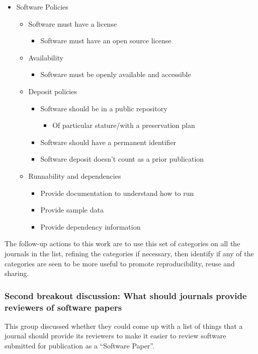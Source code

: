 \documentclass[11pt, oneside]{amsart}
\begin{document}
\begin{itemize}
\item Software Policies
\begin{itemize}
	\item Software must have a license
	\begin{itemize}
		\item Software must have an open source license
	\end{itemize}
	\item Availability
	\begin{itemize}
		\item Software must be openly available and accessible
	\end{itemize}
	\item Deposit policies
	\begin{itemize}
		\item Software should be in a public repository
		\begin{itemize}
			\item Of particular stature/with a preservation plan
		\end{itemize}
		\item Software should have a permanent identifier
		\item Software deposit doesn't count as a prior publication
	\end{itemize}
	\item Runnability and dependencies
	\begin{itemize}
		\item Provide documentation to understand how to run
		\item Provide sample data
		\item Provide dependency information
	\end{itemize}
\end{itemize}
\end{itemize}

The follow-up actions to this work are to use this set of categories on all the
journals in the list, refining the categories if necessary, then identify if any
of the categories are seen to be more useful to promote reproducibility, reuse
and sharing.

\subsubsection{Second breakout discussion: What should journals provide reviewers of software papers}

This group discussed whether they could come up with a list of things that a
journal should provide its reviewers to make it easier to review software
submitted for publication as a ``Software Paper''.
\end{document}
